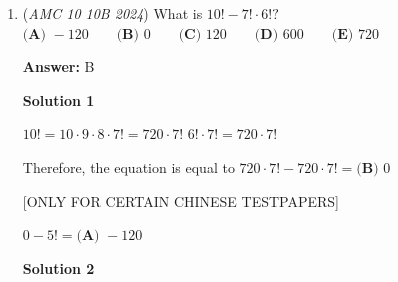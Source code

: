 \begin{enumerate}
\textbf{Solution 4}

Since the person is the 1013th person from the left and the 1010th person from the right, there are 1009 people after the 1013th person. 

 Therefore, there are 1013 + 1009 = $\boxed{\textbf{(B) } 2022}$ people in line.

 (Note: Similarly, you can perceive this information as 1012 people to the left of 1010 people and proceed.)

 



\textbf{Solution 5 (Think of a Pattern)}

If you are second going from the left and third going from the right, there are the third person out of four people $p_1,\; p_2,\; p_3,\; p_4$.

 We can simply add $1013+1010$ and subtract $1$ since you are counting yourself twice, giving $1013 + 1009$ = $\boxed{\textbf{(B) } 2022}$




\textbf{Solution 6 (Counting Along)}

The $1014$th person from the left is the $1009$th person from the right. The $1015$th person from the left is the $1008$th person from the right, and so on.

 We can see that the $n$th person from the left is the $2023 - n$th person from the left, so we can get that the first person from the right is the $2022$nd person from the left, and there are $\boxed{\textbf{(B) } 2022}$ people in the line.

 


	\item (\textit{AMC 10 10B 2024}) What is $10! - 7! \cdot 6!?$
$\textbf{(A) } -120 \qquad\textbf{(B) } 0 \qquad\textbf{(C) } 120 \qquad\textbf{(D) } 600 \qquad\textbf{(E) } 720$

 \textbf{Answer: }B



\textbf{Solution 1}

$10! = 10 \cdot 9 \cdot 8 \cdot 7! = 720 \cdot 7!$
$6! \cdot 7! = 720 \cdot 7!$

 Therefore, the equation is equal to $720 \cdot 7! - 720 \cdot 7! = \boxed{\textbf{(B) }0}$

 [ONLY FOR CERTAIN CHINESE TESTPAPERS]

 $0 - 5! = \boxed{\textbf{(A) }-120}$




\textbf{Solution 2}


\end{enumerate}
